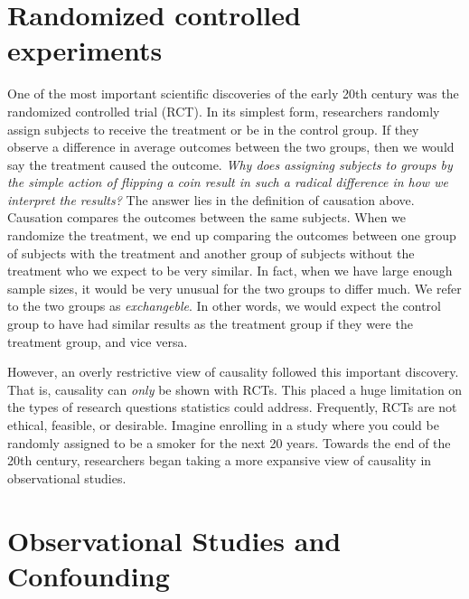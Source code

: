 \documentclass[]{book}
\begin{document}
\hypertarget{randomized-controlled-experiments}{%
\section{Randomized controlled experiments}\label{randomized-controlled-experiments}}

One of the most important scientific discoveries of the early 20th century was the randomized controlled trial (RCT). In its simplest form, researchers randomly assign subjects to receive the treatment or be in the control group. If they observe a difference in average outcomes between the two groups, then we would say the treatment caused the outcome. \emph{Why does assigning subjects to groups by the simple action of flipping a coin result in such a radical difference in how we interpret the results?} The answer lies in the definition of causation above. Causation compares the outcomes between the same subjects. When we randomize the treatment, we end up comparing the outcomes between one group of subjects with the treatment and another group of subjects without the treatment who we expect to be very similar. In fact, when we have large enough sample sizes, it would be very unusual for the two groups to differ much. We refer to the two groups as \emph{exchangeble}. In other words, we would expect the control group to have had similar results as the treatment group if they were the treatment group, and vice versa.

However, an overly restrictive view of causality followed this important discovery. That is, causality can \emph{only} be shown with RCTs. This placed a huge limitation on the types of research questions statistics could address. Frequently, RCTs are not ethical, feasible, or desirable. Imagine enrolling in a study where you could be randomly assigned to be a smoker for the next 20 years. Towards the end of the 20th century, researchers began taking a more expansive view of causality in observational studies.

\hypertarget{observational-studies-and-confounding}{%
\section{Observational Studies and Confounding}\label{observational-studies-and-confounding}}
\end{document}

